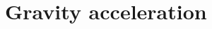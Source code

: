 \hypertarget{group___gravity_acceleration}{}\section{Gravity acceleration}
\label{group___gravity_acceleration}
